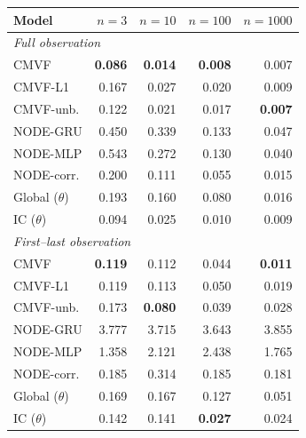 \begin{tabular}{lrrrr}
\toprule
Model & $n{=}3$ & $n{=}10$ & $n{=}100$ & $n{=}1000$ \\
\midrule
\multicolumn{5}{l}{\emph{Full observation}} \\
CMVF & \textbf{0.086} & \textbf{0.014} & \textbf{0.008} & 0.007 \\
CMVF-L1 & 0.167 & 0.027 & 0.020 & 0.009 \\
CMVF-unb. & 0.122 & 0.021 & 0.017 & \textbf{0.007} \\
NODE-GRU & 0.450 & 0.339 & 0.133 & 0.047 \\
NODE-MLP & 0.543 & 0.272 & 0.130 & 0.040 \\
NODE-corr. & 0.200 & 0.111 & 0.055 & 0.015 \\
Global ($\theta$) & 0.193 & 0.160 & 0.080 & 0.016 \\
IC ($\theta$) & 0.094 & 0.025 & 0.010 & 0.009 \\
\midrule
\multicolumn{5}{l}{\emph{First--last observation}} \\
CMVF & \textbf{0.119} & 0.112 & 0.044 & \textbf{0.011} \\
CMVF-L1 & 0.119 & 0.113 & 0.050 & 0.019 \\
CMVF-unb. & 0.173 & \textbf{0.080} & 0.039 & 0.028 \\
NODE-GRU & 3.777 & 3.715 & 3.643 & 3.855 \\
NODE-MLP & 1.358 & 2.121 & 2.438 & 1.765 \\
NODE-corr. & 0.185 & 0.314 & 0.185 & 0.181 \\
Global ($\theta$) & 0.169 & 0.167 & 0.127 & 0.051 \\
IC ($\theta$) & 0.142 & 0.141 & \textbf{0.027} & 0.024 \\
\bottomrule
\end{tabular}
